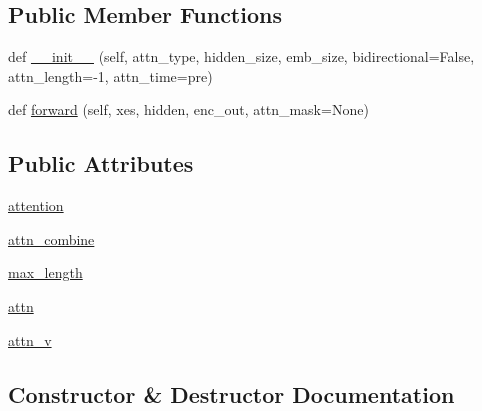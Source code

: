 \subsection*{Public Member Functions}
\begin{DoxyCompactItemize}
\item 
def \hyperlink{classparlai_1_1agents_1_1legacy__agents_1_1seq2seq_1_1modules__v0_1_1AttentionLayer_a454f7b72defa9f2dc7e8efec1ab336eb}{\+\_\+\+\_\+init\+\_\+\+\_\+} (self, attn\+\_\+type, hidden\+\_\+size, emb\+\_\+size, bidirectional=False, attn\+\_\+length=-\/1, attn\+\_\+time=\textquotesingle{}pre\textquotesingle{})
\item 
def \hyperlink{classparlai_1_1agents_1_1legacy__agents_1_1seq2seq_1_1modules__v0_1_1AttentionLayer_a6b5727eb84f3cab62adc1c647e23b98a}{forward} (self, xes, hidden, enc\+\_\+out, attn\+\_\+mask=None)
\end{DoxyCompactItemize}
\subsection*{Public Attributes}
\begin{DoxyCompactItemize}
\item 
\hyperlink{classparlai_1_1agents_1_1legacy__agents_1_1seq2seq_1_1modules__v0_1_1AttentionLayer_a0faa53163c14800b0deda68be978cd76}{attention}
\item 
\hyperlink{classparlai_1_1agents_1_1legacy__agents_1_1seq2seq_1_1modules__v0_1_1AttentionLayer_acd4f27aecfab6e05a026061bdabc42aa}{attn\+\_\+combine}
\item 
\hyperlink{classparlai_1_1agents_1_1legacy__agents_1_1seq2seq_1_1modules__v0_1_1AttentionLayer_ae7aed4fe106be5b39f7cc9027c5673f7}{max\+\_\+length}
\item 
\hyperlink{classparlai_1_1agents_1_1legacy__agents_1_1seq2seq_1_1modules__v0_1_1AttentionLayer_aedd5ce11eba4a46b40bc61a8bdad7e3d}{attn}
\item 
\hyperlink{classparlai_1_1agents_1_1legacy__agents_1_1seq2seq_1_1modules__v0_1_1AttentionLayer_a4659f062cd7e92b2015f2cdf8558449d}{attn\+\_\+v}
\end{DoxyCompactItemize}


\subsection{Constructor \& Destructor Documentation}
\mbox{\label{classparlai_1_1agents_1_1legacy__agents_1_1seq2seq_1_1modules__v0_1_1AttentionLayer_a454f7b72defa9f2dc7e8efec1ab336eb}} 
